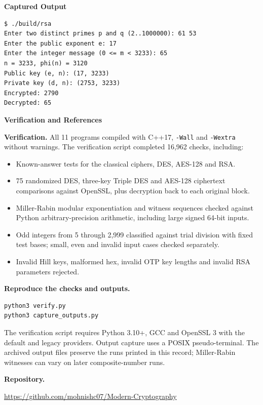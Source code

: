 \documentclass[11pt,a4paper]{article}
\begin{document}
\par\begin{minipage}{\linewidth}
\textbf{Captured Output}\par
\begin{lstlisting}[style=terminal]
$ ./build/rsa
Enter two distinct primes p and q (2..1000000): 61 53
Enter the public exponent e: 17
Enter the integer message (0 <= m < 3233): 65
n = 3233, phi(n) = 3120
Public key (e, n): (17, 3233)
Private key (d, n): (2753, 3233)
Encrypted: 2790
Decrypted: 65
\end{lstlisting}
\end{minipage}

\clearpage
{\Large\bfseries Verification and References\par}
\vspace{3mm}
\textbf{Verification.} All 11 programs compiled with C++17, \texttt{-Wall} and \texttt{-Wextra} without warnings. The verification script completed 16,962 checks, including:
\begin{itemize}
\setlength{\itemsep}{3pt}
\item Known-answer tests for the classical ciphers, DES, AES-128 and RSA.
\item 75 randomized DES, three-key Triple DES and AES-128 ciphertext comparisons against OpenSSL, plus decryption back to each original block.
\item Miller-Rabin modular exponentiation and witness sequences checked against Python arbitrary-precision arithmetic, including large signed 64-bit inputs.
\item Odd integers from 5 through 2,999 classified against trial division with fixed test bases; small, even and invalid input cases checked separately.
\item Invalid Hill keys, malformed hex, invalid OTP key lengths and invalid RSA parameters rejected.
\end{itemize}

\textbf{Reproduce the checks and outputs.}
\begin{lstlisting}[style=terminal]
python3 verify.py
python3 capture_outputs.py
\end{lstlisting}
The verification script requires Python 3.10+, GCC and OpenSSL 3 with the default and legacy providers. Output capture uses a POSIX pseudo-terminal. The archived output files preserve the runs printed in this record; Miller-Rabin witnesses can vary on later composite-number runs.

\textbf{Repository.}\par
\url{https://github.com/mohnishc07/Modern-Cryptography}
\end{document}
